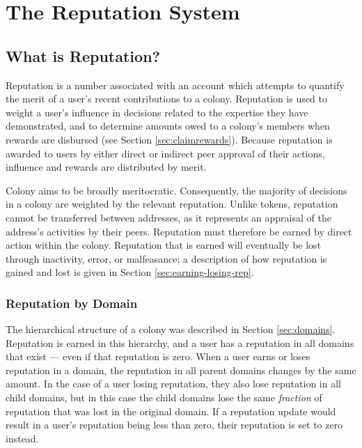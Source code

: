 \section{The Reputation System}\label{sec:reputation}
\subsection{What is Reputation?}\label{subsec:what-is-reputation}

Reputation is a number associated with an account which attempts to quantify the merit of a user's recent contributions to a colony. Reputation is used to weight a user's influence in decisions related to the expertise they have demonstrated, and to determine amounts owed to a colony's members when rewards are disbursed (see Section \ref{sec:claimrewards}). Because reputation is awarded to users by either direct or indirect peer approval of their actions, influence and rewards are distributed by merit.

Colony aims to be broadly meritocratic. Consequently, the majority of decisions in a colony are weighted by the relevant reputation. Unlike tokens, reputation cannot be transferred between addresses, %
as it represents an appraisal of the address's activities by their peers. Reputation must therefore be earned by direct action within the colony. Reputation that is earned will eventually be lost through inactivity, error, or malfeasance; a description of how reputation is gained and lost is given in Section \ref{sec:earning-losing-rep}.

\subsubsection{Reputation by Domain}\label{sec:rep-by-domain}
The hierarchical structure of a colony was described in Section \ref{sec:domains}. Reputation is earned in this hierarchy, and a user has a reputation in all domains that exist --- even if that reputation is zero. When a user earns or loses reputation in a domain, the reputation in all parent domains changes by the same amount. In the case of a user losing reputation, they also lose reputation in all child domains, but in this case the child domains lose the same \textit{fraction} of reputation that was lost in the original domain. If a reputation update would result in a user's reputation being less than zero, their reputation is set to zero instead.

